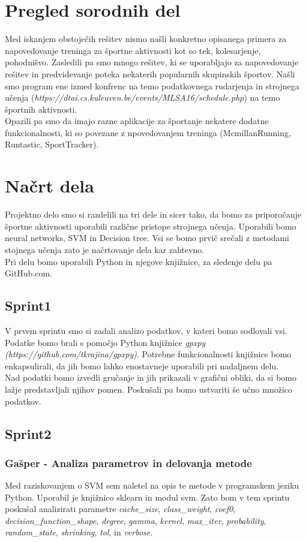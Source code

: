 \documentclass[a4paper,11pt]{article}
\begin{document}
\section{Pregled sorodnih del}
Med iskanjem obstoječih rešitev nismo našli konkretno opisanega primera 
za napovedovanje treninga za športne aktivnosti kot so tek, kolesarjenje,
pohodnišvo. Zasledili pa smo mnogo rešitev, ki se uporabljajo za napovedovanje
rešitev in predvidevanje poteka nekaterih popularnih skupinskih športov.
Našli smo program ene izmed konfrenc na temo podatkovnega rudarjenja in 
strojnega učenja (\textit{https://dtai.cs.kuleuven.be/events/MLSA16/schedule.php}) na 
temo športnih aktivnosti.\\
Opazili pa smo da imajo razne aplikacije za športanje nekatere dodatne funkcionalnosti,
ki so povezane z npovedovanjem treninga (McmillanRunning, Runtastic, SportTracker).
\section{Načrt dela}

Projektno delo smo si razdelili na tri dele in sicer tako, da bomo za priporočanje športne aktivnosti uporabili različne pristope strojnega učenja. 
Uporabili bomo neural networks, SVM in Decision tree.
Vsi se bomo prvič srečali z metodami stojnega učenja zato je načrtovanje dela kar zahtevno. \\
Pri delu bomo uporabili Python in njegove knjižnice, za sledenje delu pa GitHub.com. 

\subsection{Sprint1}
V prvem sprintu smo si zadali analizo podatkov, v kateri bomo sodlovali vsi. Podatke bomo brali s pomočjo Python knjižnice \textit{gpxpy (https://github.com/tkrajina/gpxpy)}. Potrebne funkcionalnosti knjižnice bomo enkapsulirali, da jih bomo lahko enostavneje uporabili pri nadaljnem delu.\\ Nad podatki bomo izvedli gručanje in jih prikazali v grafični obliki, da si bomo lažje predstavljali njihov pomen. Poskušali pa bomo ustvariti še učno množico podatkov.


\subsection{Sprint2}
\subsubsection{Gašper - Analiza parametrov in delovanja metode}
Med raziskovanjem o SVM sem naletel na opis te metode v programskem jeziku Python. Uporabil je knjižnico sklearn in modul svm. Zato bom v tem sprintu poskušal analizirati parametre \textit{cache_size}, \textit{class_weight}, \textit{coef0}, \textit{decision_function_shape}, \textit{degree}, \textit{gamma}, \textit{kernel}, \textit{max_iter}, \textit{probability}, \textit{random_state}, \textit{shrinking}, \textit{tol}, in \textit{verbose}. \\
\end{document}

